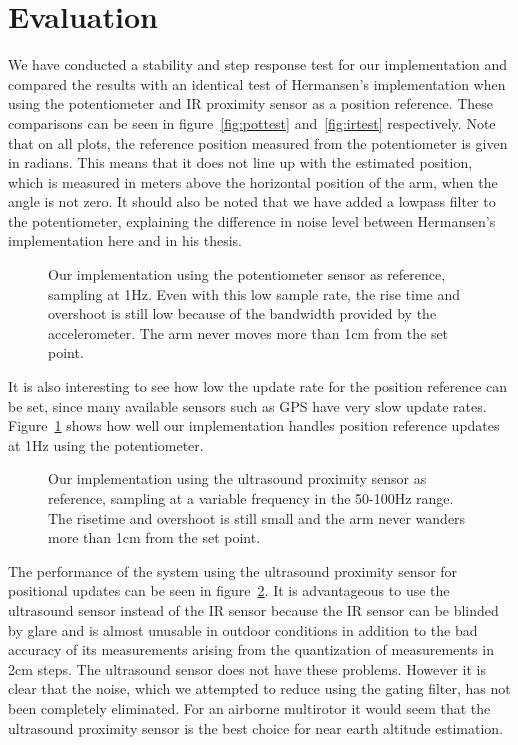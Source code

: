 \section{Evaluation}\label{sec:evaluation}
We have conducted a stability and step response test for our implementation and compared the results with an identical test of
Hermansen's implementation when using the potentiometer and IR proximity sensor as a position reference. These comparisons can be
seen in figure~\ref{fig:pottest} and~\ref{fig:irtest} respectively. Note that on all plots, the reference position measured from the
potentiometer is given in radians. This means that it does not line up with the estimated position, which is measured in meters above
the horizontal position of the arm, when the angle is not zero. It should also be noted that we have added a lowpass filter to the
potentiometer, explaining the difference in noise level between Hermansen's implementation here and in his thesis.
\begin{figure}
	\setlength\figureheight{4cm}
	\setlength\figurewidth{6cm}
	
	\caption{Our implementation using the potentiometer sensor as reference, sampling at 1Hz. Even with this low sample rate, the
		rise time and overshoot is still low because of the bandwidth provided by the accelerometer. The arm never moves more than
		1cm from the set point.}
\label{fig:pot1hztest}
\end{figure}

It is also interesting to see how low the update rate for the position reference can be set, since many available sensors such as GPS 
have very slow update rates. Figure~\ref{fig:pot1hztest} shows how well our implementation handles position reference updates at
1Hz using the potentiometer.
\begin{figure}
	\setlength\figureheight{4cm}
	\setlength\figurewidth{6cm}
	
	\caption{Our implementation using the ultrasound proximity sensor as reference, sampling at a variable frequency in the 50-100Hz 
	range. The risetime and overshoot is still small and the arm never wanders more than 1cm from the set point.}
\label{fig:ultratest}
\end{figure}


The performance of the system using the ultrasound proximity sensor for positional updates can be seen in figure~\ref{fig:ultratest}.
It is advantageous to use the ultrasound sensor instead of the IR sensor because the IR sensor can be blinded by glare and is almost
unusable in outdoor conditions in addition to the bad accuracy of its measurements arising from the quantization of measurements in
2cm steps. The ultrasound sensor does not have these problems. However it is clear that the noise, which we attempted to reduce using the
gating filter, has not been completely eliminated. For an airborne multirotor it would seem that the ultrasound proximity 
sensor is the best choice for near earth altitude estimation.
